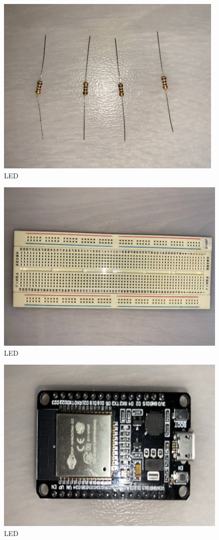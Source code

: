 \documentclass[conference]{IEEEtran}
\begin{document}
\begin{figure}[htbp]
\centerline{\includegraphics{image3.png}}
\caption{LED}
\label{fig}
\end{figure}

\begin{figure}[htbp]
\centerline{\includegraphics{image4.png}}
\caption{LED}
\label{fig}
\end{figure}

\begin{figure}[htbp]
\centerline{\includegraphics{image5.png}}
\caption{LED}
\label{fig}
\end{figure}
\end{document}
